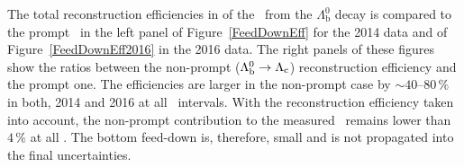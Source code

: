 The total reconstruction efficiencies in of the \Lambdac\ from the $\Lambda_\mathrm{b}^0$ decay is compared to the prompt \Lambdac\ in the left panel of Figure~\ref{FeedDownEff} for the 2014 data and of Figure~\ref{FeedDownEff2016} in the 2016 data. The right panels of these figures show the ratios between the non-prompt ($\Lambda_\mathrm{b}^0 \rightarrow {\Lambda_\text{c}}$) reconstruction efficiency and the prompt one. The efficiencies are larger in the non-prompt case by $\sim 40$--80$\,\%$ in both, 2014 and 2016 at all \pt\ intervals. With the reconstruction efficiency taken into account, the non-prompt contribution to the measured \Lambdac\ remains lower than $4\,\%$ at all \pt\@. The bottom feed-down is, therefore, small and is not propagated into the final uncertainties.
% 
% 
% 
% 
% 
